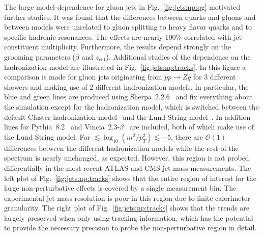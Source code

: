 \documentclass[11pt]{cernrep}
\begin{document}
The large model-dependence for gluon jets in Fig.~\ref{fig:jets:np:qg} motivated further studies.  It was found that the differences between quarks and gluons and between models were unrelated to gluon splitting to heavy flavor quarks and to specific hadronic resonances.  The effects are nearly 100\% correlated with jet constituent multiplicity.  Furthermore, the results depend strongly on the grooming parameters ($\beta$ and $z_\text{cut}$).  Additional studies of the dependence on the hadronization model are illustrated in Fig.~\ref{fig:jets:np:tracks}. In this figure a comparison is made for gluon jets originating from $pp\to Zg$ for 3 different showers and making use of 2 different hadronization models.  In particular, the blue and green lines are produced using Sherpa~2.2.6~\cite{Bothmann:2019yzt} and fix everything about the simulation except for the hadronization model, which is switched between the default Cluster hadronization model~\cite{Winter:2003tt} and the Lund String model~\cite{Sjostrand:1982fn}. In addition lines for Pythia~8.2~\cite{Sjostrand:2014zea} and Vincia~2.3-$\beta$~\cite{Fischer:2016vfv} are included, both of which make use of the Lund String model. For $\lesssim\log_{10}(m^2/p_T^2)\lesssim -5$, there are $\mathcal{O}(1)$ differences between the different hadronization models while the rest of the spectrum is nearly unchanged, as expected.  However, this region is not probed differentially in the most recent ATLAS and CMS jet mass measurements.  The left plot of Fig.~\ref{fig:jets:np:tracks} shows that the entire region of interest for the large non-perturbative effects is covered by a single measurement bin.  The experimental jet mass resolution is poor in this region due to finite calorimeter granularity.  The right plot of Fig.~\ref{fig:jets:np:tracks} shows that the trends are largely preserved when only using tracking information, which has the potential to provide the necessary precision to probe the non-perturbative region in detail.
\end{document}
